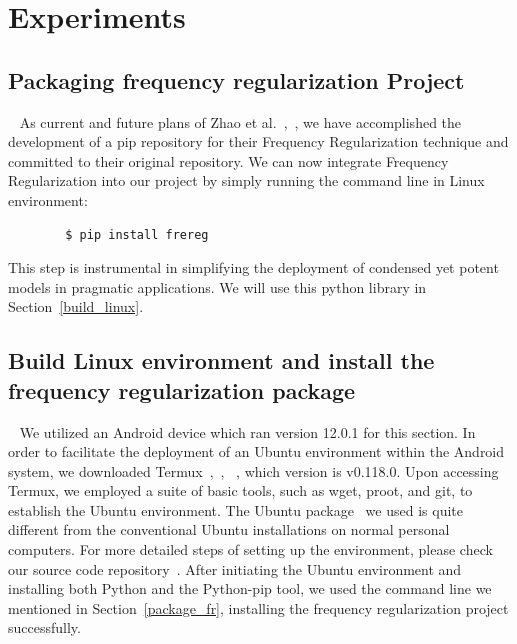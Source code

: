 \documentclass[conference]{IEEEtran}
\begin{document}
\section{Experiments} 
\subsection{Packaging frequency regularization Project}~\label{package_fr}
As current and future plans of Zhao et al.~\cite{fr_repo},~\cite{zhao2023fr}, we have accomplished the development of a pip repository for their Frequency Regularization technique and committed to their original repository. We can now integrate Frequency Regularization into our project by simply running the command line in Linux environment:

	\begin{verbatim}
		$ pip install frereg
	\end{verbatim}

This step is instrumental in simplifying the deployment of condensed yet potent models in pragmatic applications. We will use this python library in Section~\ref{build_linux}.

\subsection{Build Linux environment and install the frequency regularization package} ~\label{build_linux}
We utilized an Android device which ran version 12.0.1 for this section. In order to facilitate the deployment of an Ubuntu environment within the Android system, we downloaded Termux~\cite{termux_repo},~\cite{termux_overview},~\cite{termux_wiki} , which version is v0.118.0. Upon accessing Termux, we employed a suite of basic tools, such as wget, proot, and git, to establish the Ubuntu environment. The Ubuntu package~\cite{ubuntu_in_termux_repo} we used is quite different from the conventional Ubuntu installations on normal personal computers. For more detailed steps of setting up the environment, please check our source code repository~\cite{nerual_on_mobile_repo}. After initiating the Ubuntu environment and installing both Python and the Python-pip tool, we used the command line we mentioned in Section~\ref{package_fr}, installing the frequency regularization project successfully.
\end{document}

